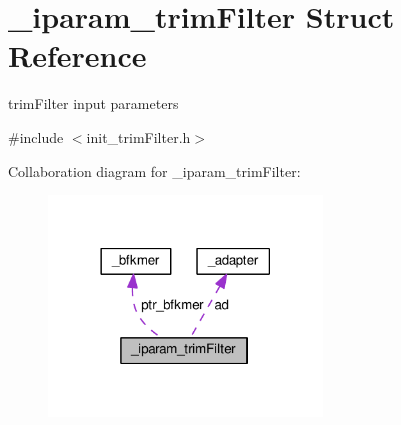 \hypertarget{struct__iparam__trimFilter}{\section{\+\_\+iparam\+\_\+trim\+Filter Struct Reference}
\label{struct__iparam__trimFilter}
}


trim\+Filter input parameters  




{\ttfamily \#include $<$init\+\_\+trim\+Filter.\+h$>$}



Collaboration diagram for \+\_\+iparam\+\_\+trim\+Filter\+:\nopagebreak
\begin{figure}[H]
\begin{center}
\leavevmode
\includegraphics[width=206pt]{struct__iparam__trimFilter__coll__graph}
\end{center}
\end{figure}
